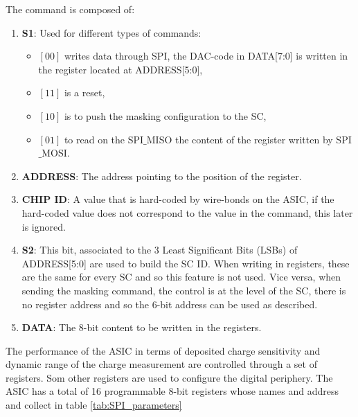 		The command is composed of: 
		\begin{enumerate}
			\item \textbf{S1}: Used for different types of commands: 
			\begin{itemize}
				\item $\left[00\right]$ writes data through SPI, the DAC-code in DATA[7:0] is written in the register located at ADDRESS[5:0],
				\item $\left[11\right]$ is a reset,
				\item $\left[10\right]$ is to push the masking configuration to the SC,
				\item $\left[01\right]$ to read on the SPI$\_$MISO the content of the register written by SPI$\_$MOSI.
			\end{itemize} 
			\item \textbf{ADDRESS}: The address pointing to the position of the register.
			\item \textbf{CHIP ID}: A value that is hard-coded by wire-bonds on the ASIC, if the hard-coded value does not correspond to the value in the command, this later is ignored. 
			\item \textbf{S2}: This bit, associated to the 3 Least Significant Bits (LSBs) of ADDRESS[5:0] are used to build the SC ID. When writing in registers, these are the same for every SC and so this feature is not used. Vice versa, when sending the masking command, the control is at the level of the SC, there is no register address and so the 6-bit address can be used as described.
			\item \textbf{DATA}: The 8-bit content to be written in the registers. 
		\end{enumerate}
		
		The performance of the ASIC in terms of deposited charge sensitivity and dynamic range of the charge measurement are controlled through a set of registers. Som other registers are used to configure the digital periphery. The ASIC has a total of 16 programmable 8-bit registers whose names and address and collect in table \ref{tab:SPI_parameters}
		
